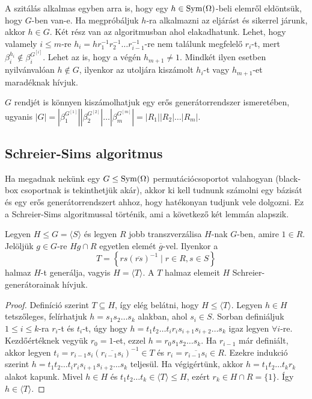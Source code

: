 A szitálás alkalmas egyben arra is, hogy egy $h \in \operatorname{Sym}(\Omega)$-beli elemről eldöntsük, hogy $G$-ben van-e.
Ha megpróbáljuk $h$-ra alkalmazni az eljárást és sikerrel járunk, akkor $h\in G$.
Két rész van az algoritmusban ahol elakadhatunk.
Lehet, hogy valamely $i \le m$-re $h_i = h r_1^{-1} r_2^{-1} \dots r_{i-1}^{-1}$-re nem találunk megfelelő $r_i$-t, mert $\beta_i^{h_i} \notin \beta_i^{G^{[i]}}$.
Lehet az is, hogy a végén $h_{m+1} \neq 1$.
Mindkét ilyen esetben nyilvánvalóan $h \notin G$, ilyenkor az utoljára kiszámolt $h_i$-t vagy $h_{m+1}$-et maradéknak hívjuk.

$G$ rendjét is könnyen kiszámolhatjuk egy erős generátorrendszer ismeretében, ugyanis $|G| = |\beta_1^{G^{[1]}}| |\beta_2^{G^{[2]}}| \dots |\beta_m^{G^{[m]}}| = |R_1| |R_2| \dots |R_m|$.

\subsection{Schreier-Sims algoritmus}
\label{subsec:permss}
Ha megadnak nekünk egy $G \le \operatorname{Sym}(\Omega)$ permutációcsoportot valahogyan (black-box csoportnak is tekinthetjük akár),
akkor ki kell tudnunk számolni egy bázisát és egy erős generátorrendszert ahhoz, hogy hatékonyan tudjunk vele dolgozni.
Ez a Schreier-Sims algoritmussal történik, ami a következő két lemmán alapszik.
\begin{lemma}[Schreier]
\label{thm:sims1}
Legyen $H \le G = \langle S \rangle$ és legyen $R$ jobb transzverzálisa $H$-nak $G$-ben, amire $1\in R$.
Jelöljük $g \in G$-re $Hg\cap R$ egyetlen elemét $\overline{g}$-vel.
Ilyenkor a
\begin{equation*}
T=\left\{ rs(\overline{rs})^{-1} \mid r\in R, s\in S \right\}
\end{equation*}
halmaz $H$-t generálja, vagyis $H=\langle T \rangle$. A $T$ halmaz elemeit $H$ Schreier-generátorainak hívjuk.
\end{lemma}
\begin{proof}
Definíció szerint $T \subseteq H$, így elég belátni, hogy $H \le \langle T \rangle$.
Legyen $h \in H$ tetszőleges, felírhatjuk $h = s_1 s_2 \dots s_k$ alakban, ahol $s_i \in S$.
Sorban definiáljuk $1 \le i \le k$-ra $r_i$-t és $t_i$-t, úgy hogy $h = t_1 t_2 \dots t_i r_i s_{i+1} s_{i+2} \dots s_k$ igaz legyen $\forall i$-re.
Kezdőértéknek vegyük $r_0=1$-et, ezzel $h = r_0 s_1 s_2 \dots s_k$.
Ha $r_{i-1}$ már definiált, akkor legyen $t_i=r_{i-1} s_i (\overline{r_{i-1} s_i})^{-1} \in T$ és $r_i = \overline{r_{i-1} s_i} \in R$.
Ezekre indukció szerint $h = t_1 t_2 \dots t_i r_i s_{i+1} s_{i+2} \dots s_k$ teljesül.
Ha végigértünk, akkor $h = t_1 t_2 \dots t_k r_k$ alakot kapunk.
Mivel $h \in H$ és $t_1 t_2 \dots t_k \in \langle T \rangle \le H$, ezért $r_k \in H\cap R = \{1\}$.
Így $h \in \langle T \rangle$.
\end{proof}
